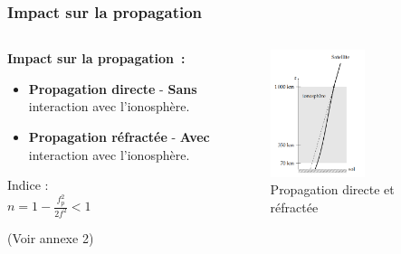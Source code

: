 \documentclass[xcolor=dvipsnames,envcountsect]{beamer}
\begin{document}
\begin{frame}
	\frametitle{Impact sur la propagation}
		\justifying
		\begin{columns}
			\begin{column}{0.5\textwidth}
				\textbf{Impact sur la propagation :} \newline
				\begin{itemize}
					\item \textbf{Propagation directe} - \textbf{Sans} interaction avec l'ionosphère. \newline
					\item \textbf{Propagation réfractée} - \textbf{Avec} interaction avec l'ionosphère.
				\end{itemize}
				\begin{center}
					{\small Indice : \\ $n=1- \frac{f_p^2}{2f^2} < 1$}
				\end{center}
				\begin{flushright}
					{\tiny (Voir annexe 2)}
				\end{flushright}
			\end{column}
			\begin{column}{0.5\textwidth}
				\begin{figure}
					\centering
					\includegraphics[width=0.6\textwidth]{./Figures/iono_e3a.png}
					\caption {Propagation directe et réfractée \cite{e3a}}
				\end{figure}
			\end{column}
	\end{columns}
\end{frame}
\end{document}
